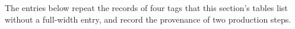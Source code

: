 \noindent The entries below repeat the records of four tags that this section's tables list without a full-width entry, and record the provenance of two production steps.

